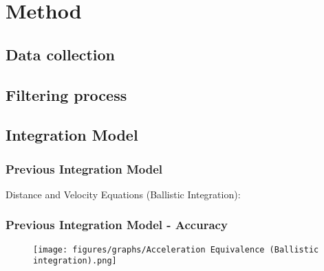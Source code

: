 
\section{Method}

\subsection{Data collection}

\subsection{Filtering process}

\subsection{Integration Model}



\begin{frame}
  \frametitle{Previous Integration Model }
    Distance and Velocity Equations (Ballistic Integration):
\end{frame}

\begin{frame}
    \frametitle{Previous Integration Model - Accuracy}
    \begin{figure}
        \centering
        \texttt{[image: figures/graphs/Acceleration Equivalence (Ballistic integration).png]}
    \end{figure}
\end{frame}


